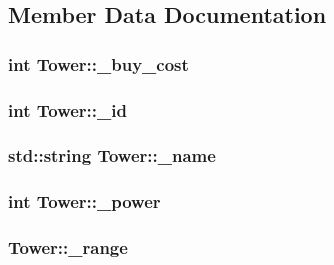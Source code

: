 \subsection{Member Data Documentation}
\hypertarget{class_tower_a102680a58c45f98a79609ce8961a7bed}{
\subsubsection[{\+\_\+buy\+\_\+cost}]{\setlength{\rightskip}{0pt plus 5cm}int Tower\+::\+\_\+buy\+\_\+cost\hspace{0.3cm}{\ttfamily [protected]}}}\label{class_tower_a102680a58c45f98a79609ce8961a7bed}
\hypertarget{class_tower_a02ec2f8d1c4dea2f7fc002d8626c8b28}{
\subsubsection[{\+\_\+id}]{\setlength{\rightskip}{0pt plus 5cm}int Tower\+::\+\_\+id\hspace{0.3cm}{\ttfamily [protected]}}}\label{class_tower_a02ec2f8d1c4dea2f7fc002d8626c8b28}
\hypertarget{class_tower_ac29247d1ed8c97c105f5f1e05fb1f92c}{
\subsubsection[{\+\_\+name}]{\setlength{\rightskip}{0pt plus 5cm}std\+::string Tower\+::\+\_\+name\hspace{0.3cm}{\ttfamily [protected]}}}\label{class_tower_ac29247d1ed8c97c105f5f1e05fb1f92c}
\hypertarget{class_tower_af9e223c165f5632944868df3dfc70bee}{
\subsubsection[{\+\_\+power}]{\setlength{\rightskip}{0pt plus 5cm}int Tower\+::\+\_\+power\hspace{0.3cm}{\ttfamily [protected]}}}\label{class_tower_af9e223c165f5632944868df3dfc70bee}
\hypertarget{class_tower_a71ece6661af3529aaa2da1bf30a53fd5}{
\subsubsection[{\+\_\+range}]{ Tower\+::\+\_\+range\hspace{0.3cm}{\ttfamily [protected]}}}\label{class_tower_a71ece6661af3529aaa2da1bf30a53fd5}
